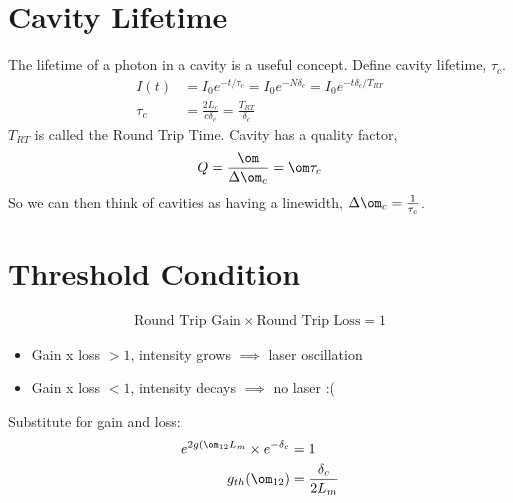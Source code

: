 \documentclass[a4paper, 11pt, normalem]{report}
\begin{document}
\section{Cavity Lifetime}
The lifetime of a photon in a cavity is a useful concept.
Define cavity lifetime, $\tau_c$.
\begin{align}
    I(t) &= I_0e^{-t/\tau_c} = I_0e^{-N\delta_c} = I_0e^{-t\delta_c/T_{RT}} \\
    \tau_c &= \frac{2L_c}{c\delta_c} = \frac{T_{RT}}{\delta_c}
\end{align}
$T_{RT}$ is called the Round Trip Time.
Cavity has a quality factor,
\begin{align}
    Q = \frac{\om}{\Delta\om_c} = \om\tau_c
\end{align}
So we can then think of cavities as having a linewidth, $\Delta\om_c = \frac{1}{\tau_c}$.

\section{Threshold Condition}
\vspace{-20pt}
\begin{align}
    \text{Round Trip Gain}\times\text{Round Trip Loss} = 1
\end{align}
\begin{itemize}
    \item Gain x loss $>1$, intensity grows $\implies$ laser oscillation
    \item Gain x loss $<1$, intensity decays $\implies$ no laser :(
\end{itemize}
Substitute for gain and loss:
\begin{align}
    e^{2g(\om_{12}L_m}\times e^{-\delta_c} &= 1 \\
    g_{th}(\om_{12}) &= \frac{\delta_c}{2L_m}
\end{align}
\end{document}
